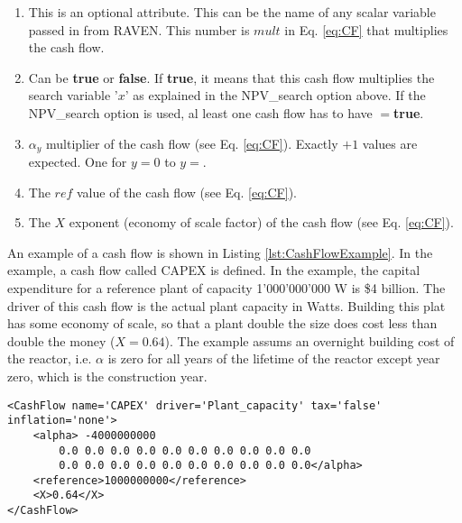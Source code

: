 \begin{enumerate}
\begin{enumerate}
  \item[\xmlAttr{multiply}] This is an optional attribute. This can be the name of any scalar variable passed in from RAVEN. This number is $mult$ in Eq. \ref{eq:CF} that multiplies the cash flow.
  \item[\xmlAttr{mult\_target}] Can be \textbf{true} or \textbf{false}. If \textbf{true}, it means that this cash flow multiplies the search variable '$x$' as explained in the NPV\_search option above.
 If the NPV\_search option is used, al least one cash flow has to have $=$\textbf{true}.
  \item[\xmlNode{alpha}] $\alpha_{y}$ multiplier of the cash flow (see Eq. \ref{eq:CF}). Exactly $ + 1$ values are expected. One for $y=0$ to $y=$.
  \item[\xmlNode{reference}] The $ref$ value of the cash flow (see Eq. \ref{eq:CF}).
  \item[\xmlNode{X}] The $X$ exponent (economy of scale factor) of the cash flow (see Eq. \ref{eq:CF}).

  \end{enumerate}
\end{enumerate}

An example of a cash flow is shown in Listing \ref{lst:CashFlowExample}. In the example, a cash flow called CAPEX is defined. In the example, the capital expenditure for a reference plant of capacity
 1'000'000'000 W is \$4 billion. The driver of this cash flow is the actual plant capacity in Watts. Building this plat has some economy of scale, so that a plant double the size does cost 
less than double the money ($X=0.64$). The example assums an overnight building cost of the reactor, i.e. $\alpha$ is zero for all years of the lifetime of the reactor except year zero, which is the construction year.

\begin{lstlisting}[style=XML,morekeywords={anAttribute},caption=CashFlow input example., label=lst:CashFlowExample]
<CashFlow name='CAPEX' driver='Plant_capacity' tax='false' inflation='none'>
    <alpha> -4000000000
        0.0 0.0 0.0 0.0 0.0 0.0 0.0 0.0 0.0 0.0
        0.0 0.0 0.0 0.0 0.0 0.0 0.0 0.0 0.0 0.0</alpha>
    <reference>1000000000</reference>
    <X>0.64</X>
</CashFlow>
\end{lstlisting}


